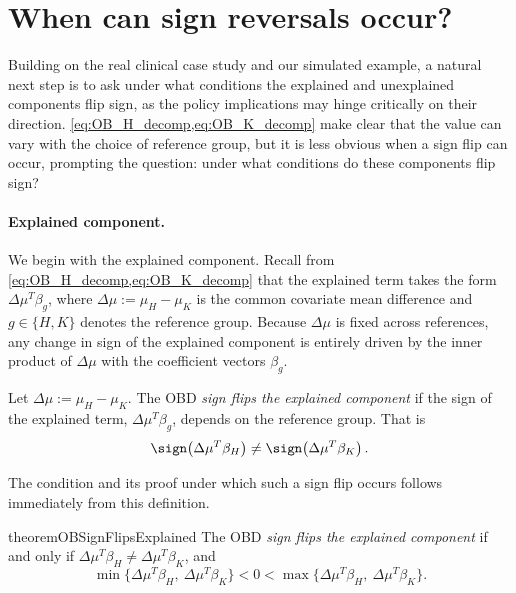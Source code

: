 \section{When can sign reversals occur?} 
\label{sec:signflips}

Building on the real clinical case study and our simulated example, a natural next step is to ask under what conditions the explained and unexplained components flip sign, as the policy implications may hinge critically on their direction. 
\cref{eq:OB_H_decomp,eq:OB_K_decomp} make clear that the value can vary with the choice of reference group, but it is less obvious when a sign flip can occur, prompting the question: under what conditions do these components flip sign?

\paragraph{Explained component.}
We begin with the explained component. Recall from \cref{eq:OB_H_decomp,eq:OB_K_decomp} that the explained term takes the form $\Delta\mu^T\beta_g$, where $\Delta\mu := \mu_H - \mu_K$ is the common covariate mean difference and $g \in \{H,K\}$ denotes the reference group. Because $\Delta\mu$ is fixed across references, any change in sign of the explained component is entirely driven by the inner product of $\Delta\mu$ with the coefficient vectors $\beta_g$.

\begin{definition}
	Let $\Delta\mu := \mu_H - \mu_K$. The OBD \emph{sign flips the explained component} if the sign of the explained term, $\Delta\mu^T \beta_g$, depends on the reference group. That is
	\begin{equation}
        \label{eq:sign_flip_condition_explained_neq}
		\sign\!\left(\Delta\mu^T \beta_H\right) \neq \sign\!\left(\Delta\mu^T \beta_K\right).
	\end{equation}
\end{definition}

The condition and its proof under which such a sign flip occurs follows immediately from this definition.

\begin{restatable}{theorem}{OBSignFlipsExplained}
    \label{thm:explained_ordering_sensitivity}
    The OBD \emph{sign flips the explained component} if and only if $\Delta\mu^T \beta_H \neq \Delta\mu^T \beta_K$, and
    \begin{equation}
    \label{eq:sign_flip_condition_explained}
        \min\{\Delta\mu^T \beta_H,\ \Delta\mu^T \beta_K\}
        < 0 <
        \max\{\Delta\mu^T \beta_H,\ \Delta\mu^T \beta_K\}.
    \end{equation}
\end{restatable}

